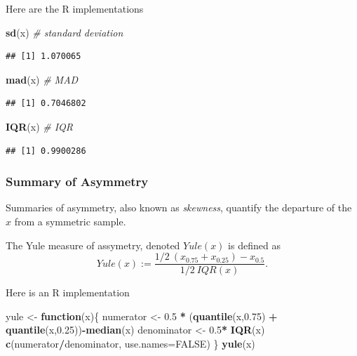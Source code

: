 \documentclass[]{book}
\newenvironment{Shaded}{\begin{snugshade}}{\end{snugshade}}
\newcommand{\KeywordTok}[1]{\textcolor[rgb]{0.13,0.29,0.53}{\textbf{#1}}}
\newcommand{\DataTypeTok}[1]{\textcolor[rgb]{0.13,0.29,0.53}{#1}}
\newcommand{\FloatTok}[1]{\textcolor[rgb]{0.00,0.00,0.81}{#1}}
\newcommand{\StringTok}[1]{\textcolor[rgb]{0.31,0.60,0.02}{#1}}
\newcommand{\CommentTok}[1]{\textcolor[rgb]{0.56,0.35,0.01}{\textit{#1}}}
\newcommand{\OtherTok}[1]{\textcolor[rgb]{0.56,0.35,0.01}{#1}}
\newcommand{\ControlFlowTok}[1]{\textcolor[rgb]{0.13,0.29,0.53}{\textbf{#1}}}
\newcommand{\OperatorTok}[1]{\textcolor[rgb]{0.81,0.36,0.00}{\textbf{#1}}}
\newcommand{\NormalTok}[1]{#1}
\theoremstyle{definition}
\theoremstyle{definition}
\theoremstyle{definition}
\theoremstyle{remark}
\let\BeginKnitrBlock\begin \let\EndKnitrBlock\end
\begin{document}
Here are the R implementations

\begin{Shaded}
\begin{Highlighting}[]
\KeywordTok{sd}\NormalTok{(x) }\CommentTok{# standard deviation}
\end{Highlighting}
\end{Shaded}

\begin{verbatim}
## [1] 1.070065
\end{verbatim}

\begin{Shaded}
\begin{Highlighting}[]
\KeywordTok{mad}\NormalTok{(x) }\CommentTok{# MAD}
\end{Highlighting}
\end{Shaded}

\begin{verbatim}
## [1] 0.7046802
\end{verbatim}

\begin{Shaded}
\begin{Highlighting}[]
\KeywordTok{IQR}\NormalTok{(x) }\CommentTok{# IQR}
\end{Highlighting}
\end{Shaded}

\begin{verbatim}
## [1] 0.9900286
\end{verbatim}

\subsubsection{Summary of Asymmetry}\label{summary-of-asymmetry}

Summaries of asymmetry, also known as \emph{skewness}, quantify the
departure of the \(x\) from a symmetric sample.

\BeginKnitrBlock{definition}[Yule]
\protect\hypertarget{def:unnamed-chunk-107}{}{\label{def:unnamed-chunk-107}
{} }The Yule measure of assymetry, denoted
\(Yule(x)\) is defined as
\[Yule(x) := \frac{1/2 \: (x_{0.75}+x_{0.25}) - x_{0.5} }{1/2 \: IQR(x)} .\]
\EndKnitrBlock{definition}

Here is an R implementation

\begin{Shaded}
\begin{Highlighting}[]
\NormalTok{yule <-}\StringTok{ }\ControlFlowTok{function}\NormalTok{(x)\{}
\NormalTok{  numerator <-}\StringTok{ }\FloatTok{0.5} \OperatorTok{*}\StringTok{ }\NormalTok{(}\KeywordTok{quantile}\NormalTok{(x,}\FloatTok{0.75}\NormalTok{) }\OperatorTok{+}\StringTok{ }\KeywordTok{quantile}\NormalTok{(x,}\FloatTok{0.25}\NormalTok{))}\OperatorTok{-}\KeywordTok{median}\NormalTok{(x) }
\NormalTok{  denominator <-}\StringTok{ }\FloatTok{0.5}\OperatorTok{*}\StringTok{ }\KeywordTok{IQR}\NormalTok{(x)}
  \KeywordTok{c}\NormalTok{(numerator}\OperatorTok{/}\NormalTok{denominator, }\DataTypeTok{use.names=}\OtherTok{FALSE}\NormalTok{)}
\NormalTok{\}}
\KeywordTok{yule}\NormalTok{(x)}
\end{Highlighting}
\end{Shaded}
\end{document}
